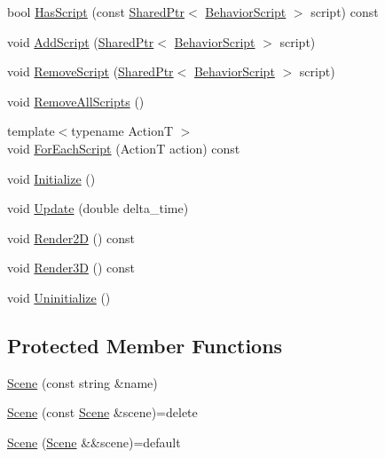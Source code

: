 \begin{DoxyCompactItemize}
\item 
bool \hyperlink{classmage_1_1_scene_a31469e19b181d0cb08bf10c554d28a6d}{Has\+Script} (const \hyperlink{namespacemage_a1e01ae66713838a7a67d30e44c67703e}{Shared\+Ptr}$<$ \hyperlink{classmage_1_1_behavior_script}{Behavior\+Script} $>$ script) const
\item 
void \hyperlink{classmage_1_1_scene_ab97b66c81c32681699052e154d0e0722}{Add\+Script} (\hyperlink{namespacemage_a1e01ae66713838a7a67d30e44c67703e}{Shared\+Ptr}$<$ \hyperlink{classmage_1_1_behavior_script}{Behavior\+Script} $>$ script)
\item 
void \hyperlink{classmage_1_1_scene_a82705ba56543dea410439760b1667bc5}{Remove\+Script} (\hyperlink{namespacemage_a1e01ae66713838a7a67d30e44c67703e}{Shared\+Ptr}$<$ \hyperlink{classmage_1_1_behavior_script}{Behavior\+Script} $>$ script)
\item 
void \hyperlink{classmage_1_1_scene_a04b6e0b4d9ca18d15d3da098e581d336}{Remove\+All\+Scripts} ()
\item 
{\footnotesize template$<$typename ActionT $>$ }\\void \hyperlink{classmage_1_1_scene_a4d16d973adce12868b9a0df9d92ef6d6}{For\+Each\+Script} (ActionT action) const
\item 
void \hyperlink{classmage_1_1_scene_a3cd12ef381ca743bf0b8f8aa2a76eb57}{Initialize} ()
\item 
void \hyperlink{classmage_1_1_scene_aa10e6eafc00834f63f146589326cbfe2}{Update} (double delta\+\_\+time)
\item 
void \hyperlink{classmage_1_1_scene_a53487349d68f0ffcc91b243d0cfb86a3}{Render2D} () const
\item 
void \hyperlink{classmage_1_1_scene_a51d2d441067d30cf3a444d6a80811f93}{Render3D} () const
\item 
void \hyperlink{classmage_1_1_scene_a714dc33c04dc2b8e2cec93564905b174}{Uninitialize} ()
\end{DoxyCompactItemize}
\subsection*{Protected Member Functions}
\begin{DoxyCompactItemize}
\item 
\hyperlink{classmage_1_1_scene_aab61b38547fc53aa9c5b3b559f4d2e26}{Scene} (const string \&name)
\item 
\hyperlink{classmage_1_1_scene_a88d83ccb2e10549d5370f850b2b4c228}{Scene} (const \hyperlink{classmage_1_1_scene}{Scene} \&scene)=delete
\item 
\hyperlink{classmage_1_1_scene_a35b8fc4242c2348e53014b96416fc3d3}{Scene} (\hyperlink{classmage_1_1_scene}{Scene} \&\&scene)=default
\end{DoxyCompactItemize}
